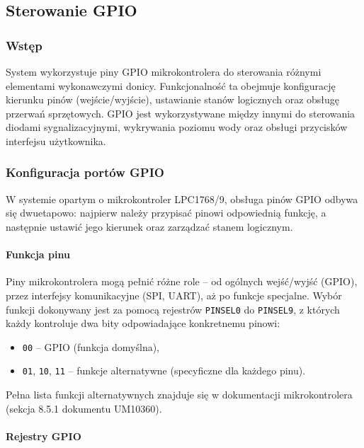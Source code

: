 \subsection{Sterowanie GPIO}

\subsubsection{Wstęp}
System wykorzystuje piny GPIO mikrokontrolera do sterowania różnymi elementami wykonawczymi donicy. Funkcjonalność ta obejmuje konfigurację kierunku pinów (wejście/wyjście), ustawianie stanów logicznych oraz obsługę przerwań sprzętowych. GPIO jest wykorzystywane między innymi do sterowania diodami sygnalizacyjnymi, wykrywania poziomu wody oraz obsługi przycisków interfejsu użytkownika.

\subsubsection{Konfiguracja portów GPIO}

W systemie opartym o mikrokontroler LPC1768/9, obsługa pinów GPIO odbywa się dwuetapowo: najpierw należy przypisać pinowi odpowiednią funkcję, a następnie ustawić jego kierunek oraz zarządzać stanem logicznym.

\paragraph{Funkcja pinu}

Piny mikrokontrolera mogą pełnić różne role – od ogólnych wejść/wyjść (GPIO), przez interfejsy komunikacyjne (SPI, UART), aż po funkcje specjalne. Wybór funkcji dokonywany jest za pomocą rejestrów \texttt{PINSEL0} do \texttt{PINSEL9}, z których każdy kontroluje dwa bity odpowiadające konkretnemu pinowi:

\begin{itemize}
    \item \texttt{00} – GPIO (funkcja domyślna),
    \item \texttt{01}, \texttt{10}, \texttt{11} – funkcje alternatywne (specyficzne dla każdego pinu).
\end{itemize}

Pełna lista funkcji alternatywnych znajduje się w dokumentacji mikrokontrolera (sekcja 8.5.1 dokumentu UM10360).

\paragraph{Rejestry GPIO}

